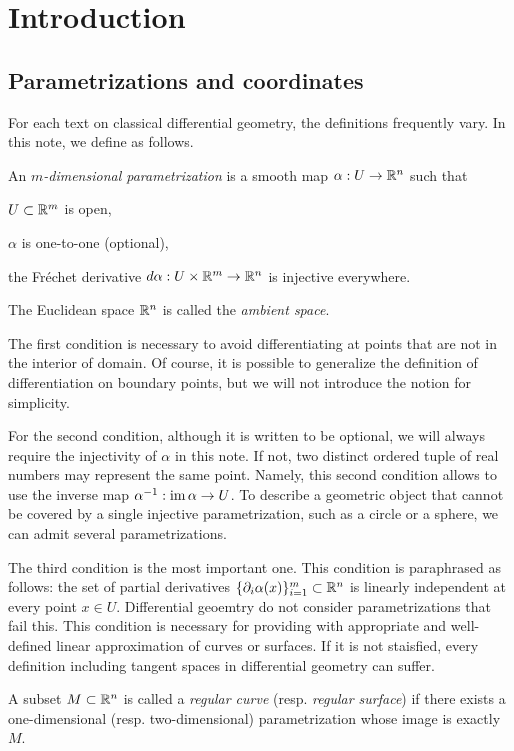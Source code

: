 \documentclass{../exp}
\def\a{\alpha}
\begin{document}
\clearpage
\section{Introduction}
\subsection{Parametrizations and coordinates}
For each text on classical differential geometry, the definitions frequently vary.
In this note, we define as follows.
\begin{defn}
An \emph{$m$-dimensional parametrization} is a smooth map $\a:U\to\R^n$ such that
\begin{cond}
\item $U\subset\mathbb{R}^m$ is open,
\item $\a$ is one-to-one (optional),
\item the Fr\'echet derivative $d\a:U\times\R^m\to\R^n$ is injective everywhere.
\end{cond}
The Euclidean space $\mathbb{R}^n$ is called the \emph{ambient space}.
\end{defn}

The first condition is necessary to avoid differentiating at points that are not in the interior of domain.
Of course, it is possible to generalize the definition of differentiation on boundary points, but we will not introduce the notion for simplicity.

For the second condition, although it is written to be optional, we will always require the injectivity of $\a$ in this note.
If not, two distinct ordered tuple of real numbers may represent the same point.
Namely, this second condition allows to use the inverse map $\a^{-1}:\im\a\to U$.
To describe a geometric object that cannot be covered by a single injective parametrization, such as a circle or a sphere, we can admit several parametrizations.

The third condition is the most important one.
This condition is paraphrased as follows: the set of partial derivatives $\{\pd_i\a(x)\}_{i=1}^m\subset\R^n$ is linearly independent at every point $x\in U$.
Differential geoemtry do not consider parametrizations that fail this.
This condition is necessary for providing with appropriate and well-defined linear approximation of curves or surfaces.
If it is not staisfied, every definition including tangent spaces in differential geometry can suffer.

\begin{defn}
A subset $M\subset\mathbb{R}^n$ is called a \emph{regular curve} (resp. \emph{regular surface}) if there exists a one-dimensional (resp. two-dimensional) parametrization whose image is exactly $M$.
\end{defn}
\end{document}
